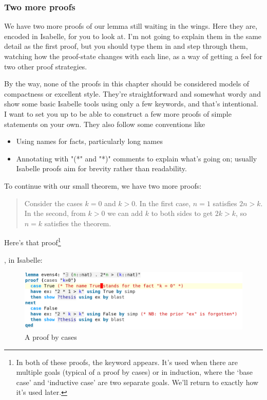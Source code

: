 \subsubsection{Two more proofs}

We have two more proofs of our lemma still waiting in the wings. Here they are, encoded in Isabelle, for you to look at. I'm not going to explain them in the same detail as the first proof, but you should type them in and step through them, watching how the proof-state changes with each line, as a way of getting a feel for two other proof strategies. 

By the way, none of the proofs in this chapter should be considered models of compactness or excellent style. They're straightforward and somewhat wordy and show some basic Isabelle tools using only a few keywords, and that's intentional. I want to set you up to be able to construct a few more proofs of simple statements on your own. They also follow some conventions like 

\begin{itemize}
    \item Using names for facts, particularly long names
    \item Annotating with "(*" and  "*)" comments to explain what's going on; usually Isabelle proofs aim for brevity rather than readability.
\end{itemize}

To continue with our small theorem, we have two more proofs: 

\begin{quotation}
Consider the cases $k = 0$ and $k > 0$. In the first case, $n = 1$ satisfies $2n > k$. In the second, from $k > 0$ we can add $k$ to both sides to get $2k > k$, so $n = k$ satisfies the theorem.
\end{quotation}

Here's that proof\footnote{In both of these proofs, the keyword  appears. It's used when there are multiple goals (typical of a proof by cases) or in induction, where the `base case' and `inductive case' are two separate goals. We'll return to exactly how it's used later.}

, in Isabelle:
\begin{figure}[h]
    \includegraphics[width=1\linewidth]{TEXT/C01/Images/proof2.png}
    \caption{A proof by cases}
\end{figure}

